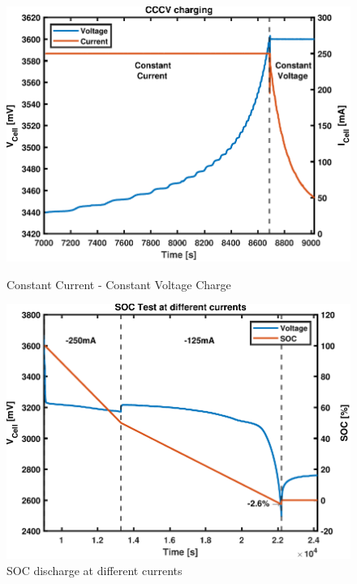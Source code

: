 \documentclass[10pt,twoside]{article}
\begin{document}
\begin{figure}[hbt!]
  \begin{minipage}[b]{0.47\textwidth}
    \includegraphics[width=\textwidth]{CCCV.pdf}
    \caption{Constant Current - Constant Voltage Charge}
    \label{fig:TestCCCV}
  \end{minipage}
  \hfill
  \begin{minipage}[b]{0.47\textwidth}
    \includegraphics[width=\textwidth]{SOC.pdf}
    \caption{SOC discharge at different currents}
    \label{fig:TestSOC}
  \end{minipage}
\end{figure}
\end{document}
